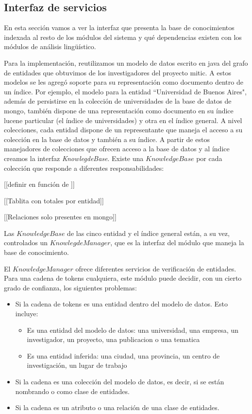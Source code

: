 \subsection{Interfaz de servicios}
\label{subsec:modelos-db}

En esta sección vamos a ver la interfaz que presenta la base de conocimientos indexada 
al resto de los módulos del sistema y qué dependencias existen con los módulos de
análisis lingüístico.

Para la implementación, reutilizamos un modelo de datos escrito en java del grafo de entidades que obtuvimos de los investigadores del proyecto mitic. A estos modelos se les agregó soporte para su representación como documento dentro de un índice. Por ejemplo, el modelo para la entidad ``Universidad de Buenos Aires", además de persistirse en la colección de universidades de la base de datos de mongo, también dispone de una representación como documento en su índice lucene particular (el índice de universidades) y otra en el índice general. A nivel colecciones, cada entidad dispone de un representante que maneja el acceso a su colección en la base de datos y también a su índice. A partir de estos manejadores de colecciones que ofrecen acceso a la base de datos y al índice creamos la interfaz \emph{KnowlegdeBase}. Existe una $KnowledgeBase$ por cada colección que responde a diferentes responsabilidades:

[[definir en función de \tradqd]]

[[Tablita con totales por entidad]]

\bigskip

[[Relaciones solo presentes en mongo]]

\bigskip

Las $KnowledgeBase$ de las cinco entidad y el índice general están, a su vez, controlados un $KnowlegdeManager$, que es la interfaz del módulo que maneja la base de conocimiento. 

El $KnowledgeManager$ ofrece diferentes servicios de verificación de entidades. Para una cadena de tokens cualquiera, este módulo puede decidir, con un cierto grado de confianza, los siguientes problemas:

\begin{itemize}
  \item Si la cadena de tokens es una entidad dentro del modelo de datos. Esto incluye:
    \begin{itemize}
      \item Es una entidad del modelo de datos: una universidad, una empresa, un investigador, un proyecto, una publicacion o una tematica
      \item Es una entidad inferida: una ciudad, una provincia, un centro de investigación, un lugar de trabajo
    \end{itemize}
  \item Si la cadena es una colección del modelo de datos, es decir, si se están nombrando  o  como clase de entidades.
  \item Si la cadena es un atributo o una relación de una clase de entidades.
\end{itemize}


